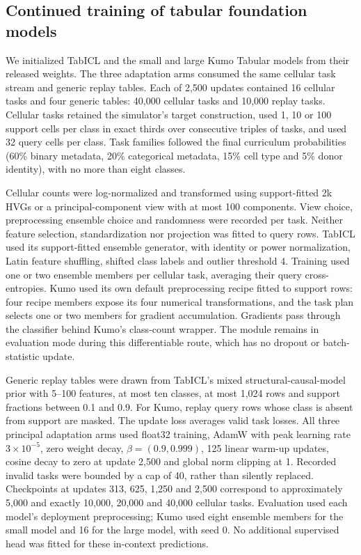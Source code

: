\subsection*{Continued training of tabular foundation models}
\label{methods:tabular-adaptation}
We initialized TabICL and the small and large Kumo Tabular models from their released weights\citep{qu2026tabiclv2,nvidia2026kumo}. The three adaptation arms consumed the same cellular task stream and generic replay tables. Each of 2,500 updates contained 16 cellular tasks and four generic tables: 40,000 cellular tasks and 10,000 replay tasks. Cellular tasks retained the simulator's target construction, used 1, 10 or 100 support cells per class in exact thirds over consecutive triples of tasks, and used 32 query cells per class. Task families followed the final curriculum probabilities (60\% binary metadata, 20\% categorical metadata, 15\% cell type and 5\% donor identity), with no more than eight classes.

Cellular counts were log-normalized and transformed using support-fitted 2k HVGs or a principal-component view with at most 100 components. View choice, preprocessing ensemble choice and randomness were recorded per task. Neither feature selection, standardization nor projection was fitted to query rows. TabICL used its support-fitted ensemble generator, with identity or power normalization, Latin feature shuffling, shifted class labels and outlier threshold 4. Training used one or two ensemble members per cellular task, averaging their query cross-entropies. Kumo used its own default preprocessing recipe fitted to support rows: four recipe members expose its four numerical transformations, and the task plan selects one or two members for gradient accumulation. Gradients pass through the classifier behind Kumo's class-count wrapper. The module remains in evaluation mode during this differentiable route, which has no dropout or batch-statistic update.

Generic replay tables were drawn from TabICL's mixed structural-causal-model prior with 5--100 features, at most ten classes, at most 1,024 rows and support fractions between 0.1 and 0.9. For Kumo, replay query rows whose class is absent from support are masked. The update loss averages valid task losses. All three principal adaptation arms used float32 training, AdamW with peak learning rate $3\times10^{-5}$, zero weight decay, $\beta=(0.9,0.999)$, 125 linear warm-up updates, cosine decay to zero at update 2,500 and global norm clipping at 1. Recorded invalid tasks were bounded by a cap of 40, rather than silently replaced. Checkpoints at updates 313, 625, 1,250 and 2,500 correspond to approximately 5,000 and exactly 10,000, 20,000 and 40,000 cellular tasks. Evaluation used each model's deployment preprocessing; Kumo used eight ensemble members for the small model and 16 for the large model, with seed 0. No additional supervised head was fitted for these in-context predictions.

